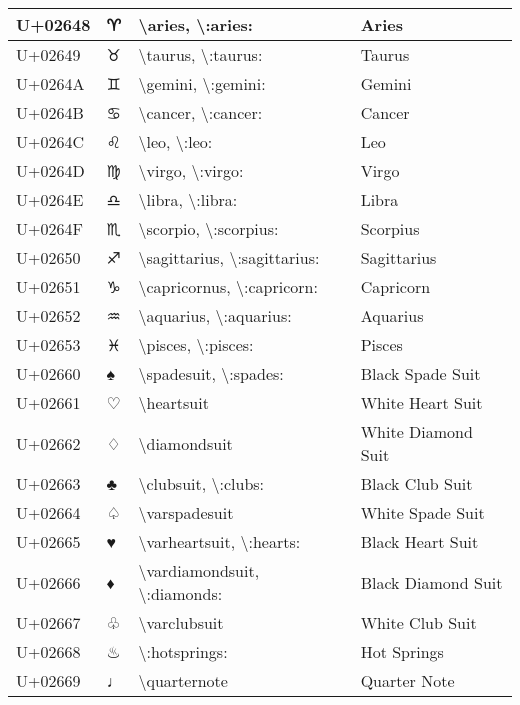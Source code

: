 \begin{table}[h]
\begin{tabulary}{\linewidth}{|L|L|L|L|}
\hline
U+02648 & ♈ & {\textbackslash}aries, {\textbackslash}:aries: & Aries \\
\hline
U+02649 & ♉ & {\textbackslash}taurus, {\textbackslash}:taurus: & Taurus \\
\hline
U+0264A & ♊ & {\textbackslash}gemini, {\textbackslash}:gemini: & Gemini \\
\hline
U+0264B & ♋ & {\textbackslash}cancer, {\textbackslash}:cancer: & Cancer \\
\hline
U+0264C & ♌ & {\textbackslash}leo, {\textbackslash}:leo: & Leo \\
\hline
U+0264D & ♍ & {\textbackslash}virgo, {\textbackslash}:virgo: & Virgo \\
\hline
U+0264E & ♎ & {\textbackslash}libra, {\textbackslash}:libra: & Libra \\
\hline
U+0264F & ♏ & {\textbackslash}scorpio, {\textbackslash}:scorpius: & Scorpius \\
\hline
U+02650 & ♐ & {\textbackslash}sagittarius, {\textbackslash}:sagittarius: & Sagittarius \\
\hline
U+02651 & ♑ & {\textbackslash}capricornus, {\textbackslash}:capricorn: & Capricorn \\
\hline
U+02652 & ♒ & {\textbackslash}aquarius, {\textbackslash}:aquarius: & Aquarius \\
\hline
U+02653 & ♓ & {\textbackslash}pisces, {\textbackslash}:pisces: & Pisces \\
\hline
U+02660 & ♠ & {\textbackslash}spadesuit, {\textbackslash}:spades: & Black Spade Suit \\
\hline
U+02661 & ♡ & {\textbackslash}heartsuit & White Heart Suit \\
\hline
U+02662 & ♢ & {\textbackslash}diamondsuit & White Diamond Suit \\
\hline
U+02663 & ♣ & {\textbackslash}clubsuit, {\textbackslash}:clubs: & Black Club Suit \\
\hline
U+02664 & ♤ & {\textbackslash}varspadesuit & White Spade Suit \\
\hline
U+02665 & ♥ & {\textbackslash}varheartsuit, {\textbackslash}:hearts: & Black Heart Suit \\
\hline
U+02666 & ♦ & {\textbackslash}vardiamondsuit, {\textbackslash}:diamonds: & Black Diamond Suit \\
\hline
U+02667 & ♧ & {\textbackslash}varclubsuit & White Club Suit \\
\hline
U+02668 & ♨ & {\textbackslash}:hotsprings: & Hot Springs \\
\hline
U+02669 & ♩ & {\textbackslash}quarternote & Quarter Note \\

\end{tabulary}
\end{table}
